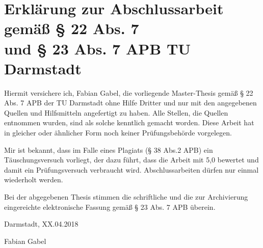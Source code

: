 \thispagestyle{empty}
\section*{Erklärung zur Abschlussarbeit gemäß § 22 Abs. 7 \\und § 23 Abs. 7 APB TU Darmstadt}

Hiermit versichere ich, Fabian Gabel, die vorliegende Master-Thesis gemäß § 22 Abs. 7 APB der TU Darmstadt ohne Hilfe Dritter und nur mit den angegebenen Quellen und Hilfsmitteln angefertigt zu haben. Alle Stellen, die Quellen entnommen wurden, sind als solche kenntlich gemacht worden. Diese Arbeit hat in gleicher oder ähnlicher Form noch keiner Prüfungsbehörde vorgelegen. 

Mir ist bekannt, dass im Falle eines Plagiats (§ 38 Abs.2 APB) ein Täuschungsversuch vorliegt, der dazu führt, dass die Arbeit mit 5,0 bewertet und damit ein Prüfungsversuch verbraucht wird. Abschlussarbeiten dürfen nur einmal wiederholt werden.

Bei der abgegebenen Thesis stimmen die schriftliche und die zur Archivierung eingereichte elektronische Fassung gemäß § 23 Abs. 7 APB überein.

%
%
%
\vspace{20pt}


\noindent
Darmstadt, XX.04.2018\vspace{70pt}


\noindent
Fabian Gabel
